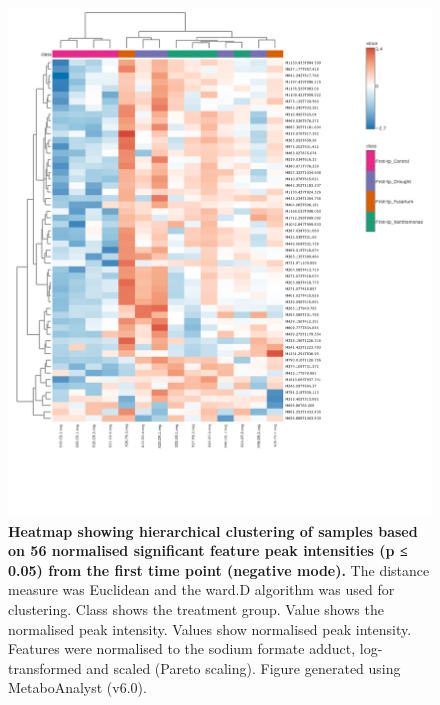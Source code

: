 \newpage
\begin{figure}[htp!]
    \centering
    \includegraphics[width=\textwidth]{Appendices/Sig56FeaturesRedSamplesFirstTimePointOnly-ExcludingQCs.png}
    \caption[Heatmap showing hierarchical clustering of samples based on 56 normalised significant feature peak intensities (p ≤ 0.05) from the first time point (negative mode)]{\textbf{Heatmap showing hierarchical clustering of samples based on 56 normalised significant feature peak intensities (p ≤ 0.05) from the first time point (negative mode).} The distance measure was Euclidean and the ward.D algorithm was used for clustering. Class shows the treatment group. Value shows the normalised peak intensity. Values show normalised peak intensity. Features were normalised to the sodium formate  adduct, log-transformed and scaled (Pareto scaling). Figure generated using MetaboAnalyst (v6.0).}
    \label{fig:Sig56FeaturesNegMode}
\end{figure}

